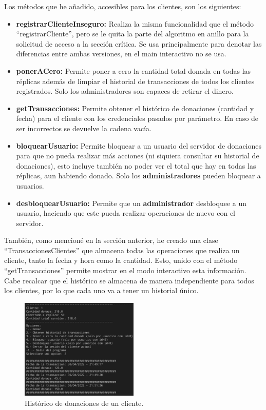 \documentclass{article}
\begin{document}
Los métodos que he añadido, accesibles para los clientes, son los siguientes:

\begin{itemize}
    \item \textbf{registrarClienteInseguro: }Realiza la misma funcionalidad que el método ``registrarCliente'', pero se le quita la parte del algoritmo en anillo para la solicitud de acceso a la sección crítica. Se usa principalmente para denotar las diferencias entre ambas versiones, en el main interactivo no se usa.
    \item \textbf{ponerACero: }Permite poner a cero la cantidad total donada en todas las réplicas además de limpiar el historial de transacciones de todos los clientes registrados. Solo los administradores son capaces de retirar el dinero.
    \item \textbf{getTransacciones: }Permite obtener el histórico de donaciones (cantidad y fecha) para el cliente con los credenciales pasados por parámetro. En caso de ser incorrectos se devuelve la cadena vacía.
    \item \textbf{bloquearUsuario: }Permite bloquear a un usuario del servidor de donaciones para que no pueda realizar más acciones (ni siquiera consultar su historial de donaciones), esto incluye también no poder ver el total que hay en todas las réplicas, aun habiendo donado. Solo los \textbf{administradores} pueden bloquear a usuarios.
    \item \textbf{desbloquearUsuario: }Permite que un \textbf{administrador} desbloquee a un usuario, haciendo que este pueda realizar operaciones de nuevo con el servidor.
\end{itemize}

También, como mencioné en la sección anterior, he creado una clase ``TransaccionesClientes'' que almacena todas las operaciones que realiza un cliente, tanto la fecha y hora como la cantidad. Esto, unido con el método ``getTransacciones'' permite mostrar en el modo interactivo esta información. Cabe recalcar que el histórico se almacena de manera independiente para todos los clientes, por lo que cada uno va a tener un historial único.

\begin{figure}[H]
    \centering
    \includegraphics[width=0.5\textwidth]{imagenes/historico.png}
    \caption{Histórico de donaciones de un cliente.}
\end{figure}
\end{document}
